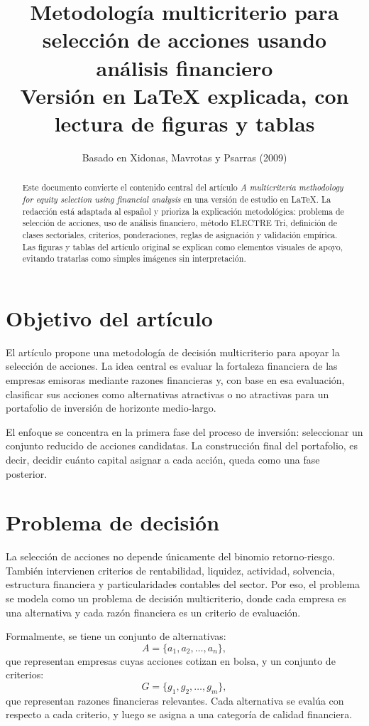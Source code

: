 \documentclass[11pt,a4paper]{article}
\title{Metodología multicriterio para selección de acciones usando análisis financiero\\
\large Versión en \LaTeX{} explicada, con lectura de figuras y tablas}
\author{Basado en Xidonas, Mavrotas y Psarras (2009)}
\date{}
\begin{document}
\maketitle

\begin{abstract}
Este documento convierte el contenido central del artículo \textit{A multicriteria methodology for equity selection using financial analysis} en una versión de estudio en \LaTeX{}. La redacción está adaptada al español y prioriza la explicación metodológica: problema de selección de acciones, uso de análisis financiero, método ELECTRE Tri, definición de clases sectoriales, criterios, ponderaciones, reglas de asignación y validación empírica. Las figuras y tablas del artículo original se explican como elementos visuales de apoyo, evitando tratarlas como simples imágenes sin interpretación.
\end{abstract}

\section{Objetivo del artículo}

El artículo propone una metodología de decisión multicriterio para apoyar la selección de acciones. La idea central es evaluar la fortaleza financiera de las empresas emisoras mediante razones financieras y, con base en esa evaluación, clasificar sus acciones como alternativas atractivas o no atractivas para un portafolio de inversión de horizonte medio-largo.

El enfoque se concentra en la primera fase del proceso de inversión: seleccionar un conjunto reducido de acciones candidatas. La construcción final del portafolio, es decir, decidir cuánto capital asignar a cada acción, queda como una fase posterior.

\section{Problema de decisión}

La selección de acciones no depende únicamente del binomio retorno-riesgo. También intervienen criterios de rentabilidad, liquidez, actividad, solvencia, estructura financiera y particularidades contables del sector. Por eso, el problema se modela como un problema de decisión multicriterio, donde cada empresa es una alternativa y cada razón financiera es un criterio de evaluación.

Formalmente, se tiene un conjunto de alternativas:
\[
A=\{a_1,a_2,\ldots,a_n\},
\]
que representan empresas cuyas acciones cotizan en bolsa, y un conjunto de criterios:
\[
G=\{g_1,g_2,\ldots,g_m\},
\]
que representan razones financieras relevantes. Cada alternativa se evalúa con respecto a cada criterio, y luego se asigna a una categoría de calidad financiera.
\end{document}
